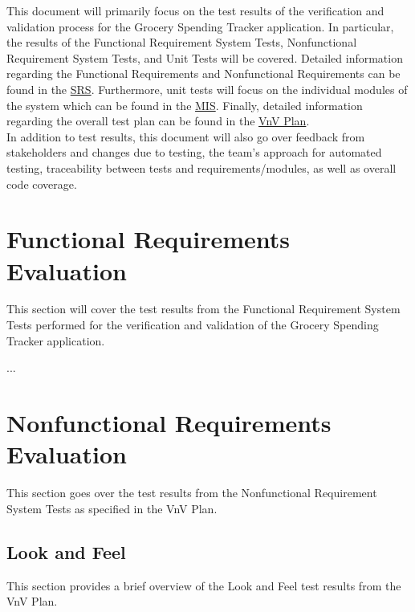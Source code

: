 \documentclass[12pt, titlepage]{article}
\begin{document}
\listoffigures %

\newpage


This document will primarily focus on the test results of the verification and validation process
for the Grocery Spending Tracker application. In particular, the results of the Functional Requirement System Tests,
Nonfunctional Requirement System Tests, and Unit Tests will be covered. Detailed information regarding
the Functional Requirements and Nonfunctional Requirements can be found in the
\href{https://github.com/r-yeh/grocery-spending-tracker/blob/master/docs/SRS/SRS.pdf}{SRS}. Furthermore,
unit tests will focus on the individual modules of the system which can be found in the
\href{https://github.com/r-yeh/grocery-spending-tracker/blob/master/docs/Design/SoftDetailedDes/MIS.pdf}{MIS}.
Finally, detailed information regarding the overall test plan can be found in the
\href{https://github.com/r-yeh/grocery-spending-tracker/blob/master/docs/VnVPlan/VnVPlan.pdf}{VnV Plan}.\\

In addition to test results, this document will also go over feedback from stakeholders and changes due to testing,
the team's approach for automated testing, traceability between tests and requirements/modules, as well as
overall code coverage.

\section{Functional Requirements Evaluation}

This section will cover the test results from the Functional Requirement System Tests
performed for the verification and validation of the Grocery Spending Tracker application.

...

\section{Nonfunctional Requirements Evaluation}

This section goes over the test results from the Nonfunctional Requirement System Tests as
specified in the VnV Plan.

\subsection{Look and Feel}

This section provides a brief overview of the Look and Feel test results from the VnV Plan.
\end{document}
